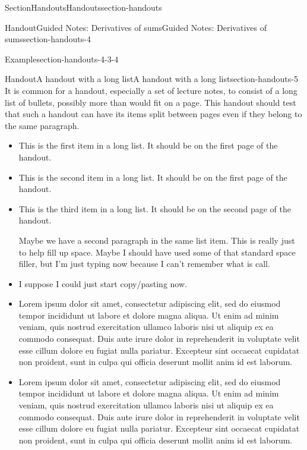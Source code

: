 \documentclass[oneside,10pt,]{article}
\newcommand{\ptxlistdisc}{\raisebox{0.3ex}{\textbullet}}
\numberwithin{equation}{section}
\begin{document}
\begin{sectionptx}{Section}{Handouts}{}{Handouts}{}{}{section-handouts}
\begin{handout-subsection}{Handout}{Guided Notes: Derivatives of sums}{}{Guided Notes: Derivatives of sums}{}{}{section-handouts-4}
\begin{example}{Example}{}{section-handouts-4-3-4}
\end{example}
\end{handout-subsection}
\restoregeometry
%
%
\typeout{************************************************}
\typeout{************************************************}
%
\begin{handout-subsection}{Handout}{A handout with a long list}{}{A handout with a long list}{}{}{section-handouts-5}
It is common for a handout, especially a set of lecture notes, to consist of a long list of bullets, possibly more than would fit on a page.  This handout should test that such a handout can have its items split between pages even if they belong to the same paragraph.%
\begin{itemize}[label=\ptxlistdisc]
\item{}This is the first item in a long list.  It should be on the first page of the handout.%
\item{}This is the second item in a long list.  It should be on the first page of the handout.%
\item{}This is the third item in a long list.  It should be on the second page of the handout.%
\par
Maybe we have a second paragraph in the same list item.  This is really just to help fill up space.  Maybe I should have used some of that standard space filler, but I'm just typing now because I can't remember what is call.%
\item{}I suppose I could just start copy\slash{}pasting now.%
\item{}Lorem ipsum dolor sit amet, consectetur adipiscing elit, sed do eiusmod tempor incididunt ut labore et dolore magna aliqua. Ut enim ad minim veniam, quis nostrud exercitation ullamco laboris nisi ut aliquip ex ea commodo consequat. Duis aute irure dolor in reprehenderit in voluptate velit esse cillum dolore eu fugiat nulla pariatur. Excepteur sint occaecat cupidatat non proident, sunt in culpa qui officia deserunt mollit anim id est laborum.%
\item{}Lorem ipsum dolor sit amet, consectetur adipiscing elit, sed do eiusmod tempor incididunt ut labore et dolore magna aliqua. Ut enim ad minim veniam, quis nostrud exercitation ullamco laboris nisi ut aliquip ex ea commodo consequat. Duis aute irure dolor in reprehenderit in voluptate velit esse cillum dolore eu fugiat nulla pariatur. Excepteur sint occaecat cupidatat non proident, sunt in culpa qui officia deserunt mollit anim id est laborum.%

\end{itemize}
\end{handout-subsection}
\end{sectionptx}
\end{document}

